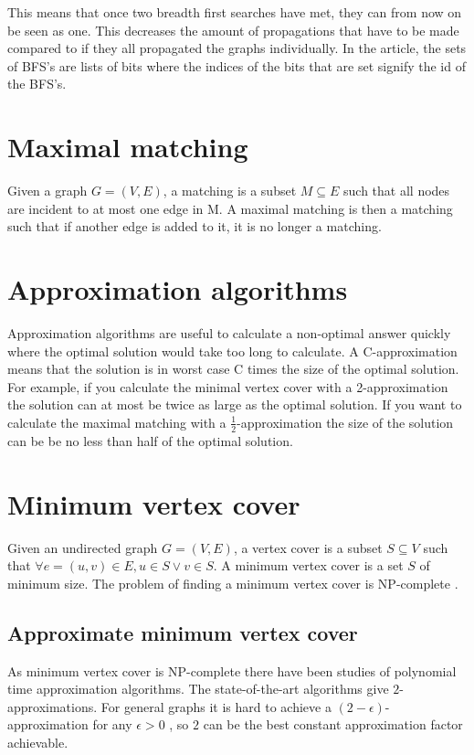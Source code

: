 This means that once two breadth first searches have met, they can from now on be seen as one. This decreases the amount of propagations that have to be made compared to if they all propagated the graphs individually. In the article, the sets of BFS's are lists of bits where the indices of the bits that are set signify the id of the BFS's.

\section{Maximal matching}
Given a graph $G = (V,E)$, a matching is a subset $M \subseteq E$ such that all nodes are incident to at most one edge in M. A maximal matching is then a matching such that if another edge is added to it, it is no longer a matching. 

\section{Approximation algorithms}
Approximation algorithms are useful to calculate a non-optimal answer quickly where the optimal solution would take too long to calculate. A C-approximation means that the solution is in worst case C times the size of the optimal solution. For example, if you calculate the minimal vertex cover with a 2-approximation the solution can at most be twice as large as the optimal solution. If you want to calculate the maximal matching with a $\frac{1}{2}$-approximation the size of the solution can be be no less than half of the optimal solution.

\section{Minimum vertex cover}
Given an undirected graph $G = (V,E)$, a vertex cover is a subset $S \subseteq V$ such that $\forall e = (u,v) \in E,  u \in S \vee v \in S$. A minimum vertex cover is a set $S$ of minimum size. The problem of finding a minimum vertex cover is NP-complete \cite{Kar72}.

\subsection{Approximate minimum vertex cover}
As minimum vertex cover is NP-complete there have been studies of polynomial time approximation algorithms. The state-of-the-art algorithms give $2$-approximations. For general graphs it is hard to achieve a $(2-\epsilon)$-approximation for any $\epsilon > 0$ \cite{2-evchard}, so $2$ can be the best constant approximation factor achievable.

